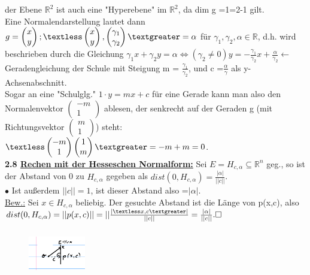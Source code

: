 \documentclass[]{scrartcl}
\begin{document}
der Ebene $\mathbb{R}^2$ ist auch eine "Hyperebene" im $\mathbb{R}^2$, da dim g 
=1=2-1 gilt.\\
Eine Normalendarstellung lautet dann $g={\begin{pmatrix}
		x\\
		y
\end{pmatrix} ;\textless \begin{pmatrix}
x\\
y
\end{pmatrix} ,
\begin{pmatrix}
	\gamma_1\\
	\gamma_2
\end{pmatrix}  \textgreater = \alpha}$ für $\gamma_1, \gamma_2, \alpha \in \mathbb{R}$, d.h. wird beschrieben durch die Gleichung $\gamma_1 x+ \gamma_2 y = \alpha \Leftrightarrow (\gamma_2 \neq 0) y = -\frac{\gamma_1}{\gamma_2}x + \frac{\alpha}{\gamma_2} \leftarrow$ Geradengleichung der Schule mit Steigung m = $\frac{\gamma_1}{\gamma_2}$, und c =$\frac{\alpha}{\gamma}$ als y-Achsenabschnitt.\\
Sogar an eine "Schulglg." $1\cdot y=mx+c$
 für eine Gerade kann man also den Normalenvektor $\begin{pmatrix}
 	-m\\
 	1
 \end{pmatrix}$ ablesen, der senkrecht auf der Geraden g (mit Richtungsvektor $\begin{pmatrix}
 m\\
 1
 \end{pmatrix}$) steht: $\textless \begin{pmatrix}
 -m\\
 1
 \end{pmatrix}\begin{pmatrix}
 1\\
 m
 \end{pmatrix} \textgreater = -m +m =0$.\\
 \newpage
\textbf{2.8 \underline{Rechen mit der Hesseschen Normalform:}}
 Sei $E= H_{c,\alpha}\subseteq \mathbb{R}^n$ geg., so ist der Abstand von 0 zu $H_{c,\alpha}$ gegeben als $dist(0,H_{c,\alpha})=\frac{|\alpha|}{||c||}$.\\
 $\bullet$ Ist außerdem $||c||=1$, ist dieser Abstand also =$|\alpha|$.\\
 \underline{Bew.:} Sei $x\in H_{c,\alpha}$ beliebig.
 Der gesuchte Abstand ist die Länge von p(x,c), also $dist(0, H_{c,\alpha})=||p(x,c)||=||\frac{|\textless x,c\textgreater|}{||c||}=\frac{|\alpha|}{||c||}. \square$
 \begin{figure}[h]
 	\includegraphics[width=2.5cm,height=2cm]{Beispiel 2.8}
 \end{figure}\\
\end{document}
